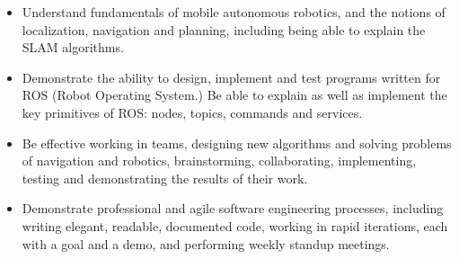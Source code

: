 \begin{itemize}
\item Understand fundamentals of mobile autonomous robotics, and the notions of localization, navigation and planning, including being able to explain the SLAM algorithms.
\item Demonstrate the ability to design, implement and test programs written for ROS (Robot Operating System.) Be able to explain as well as implement the key primitives of ROS: nodes, topics, commands and services.
\item Be effective working in teams, designing new algorithms and solving problems of navigation and robotics, brainstorming, collaborating, implementing, testing and demonstrating the results of their work.
\item Demonstrate professional and agile software engineering processes, including writing elegant, readable, documented code, working in rapid iterations, each with a goal and a demo, and performing weekly standup meetings.
\end{itemize}
